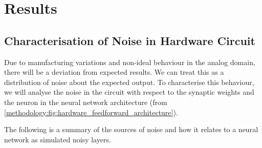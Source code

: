 
\chapter{Results}
\label{ch:results}

\vspace{1em}

\section{Characterisation of Noise in Hardware Circuit}
\label{results:noisemodel}

\noindent
Due to manufacturing variations and non-ideal behaviour in the analog domain, there will be a deviation from expected results. We can treat this as a distribution of noise about the expected output. To characterise this behaviour, we will analyse the noise in the circuit with respect to the synaptic weights and the neuron in the neural network architecture (from \autoref{methodology:fig:hardware_feedforward_architecture}).

\vspace{1em}

\noindent
The following is a summary of the sources of noise and how it relates to a neural network as simulated noisy layers.

